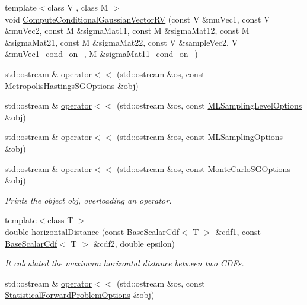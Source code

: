 \begin{DoxyCompactItemize}
\item 
{\footnotesize template$<$class V , class M $>$ }\\void \hyperlink{namespace_q_u_e_s_o_ad6d1e060295dcebaf3253c342c2a8746}{Compute\-Conditional\-Gaussian\-Vector\-R\-V} (const V \&mu\-Vec1, const V \&mu\-Vec2, const M \&sigma\-Mat11, const M \&sigma\-Mat12, const M \&sigma\-Mat21, const M \&sigma\-Mat22, const V \&sample\-Vec2, V \&mu\-Vec1\-\_\-cond\-\_\-on\-\_, M \&sigma\-Mat11\-\_\-cond\-\_\-on\-\_)
\item 
std\-::ostream \& \hyperlink{namespace_q_u_e_s_o_ab4def712856f22b50e34d21ef9093ac1}{operator$<$$<$} (std\-::ostream \&os, const \hyperlink{class_q_u_e_s_o_1_1_metropolis_hastings_s_g_options}{Metropolis\-Hastings\-S\-G\-Options} \&obj)
\item 
std\-::ostream \& \hyperlink{namespace_q_u_e_s_o_a81f910061e4d4ba4b3f823ffc3cc04dc}{operator$<$$<$} (std\-::ostream \&os, const \hyperlink{class_q_u_e_s_o_1_1_m_l_sampling_level_options}{M\-L\-Sampling\-Level\-Options} \&obj)
\item 
std\-::ostream \& \hyperlink{namespace_q_u_e_s_o_a5986e83af9a9a4845f9eeb03d94a8a94}{operator$<$$<$} (std\-::ostream \&os, const \hyperlink{class_q_u_e_s_o_1_1_m_l_sampling_options}{M\-L\-Sampling\-Options} \&obj)
\item 
std\-::ostream \& \hyperlink{namespace_q_u_e_s_o_a1e37d289bad8dc2aa2600ea78d1a6d9f}{operator$<$$<$} (std\-::ostream \&os, const \hyperlink{class_q_u_e_s_o_1_1_monte_carlo_s_g_options}{Monte\-Carlo\-S\-G\-Options} \&obj)
\begin{DoxyCompactList}\small\item\em Prints the object {\ttfamily obj}, overloading an operator. \end{DoxyCompactList}\item 
{\footnotesize template$<$class T $>$ }\\double \hyperlink{namespace_q_u_e_s_o_a389e9373827829b35f2bf36df32d0ef1}{horizontal\-Distance} (const \hyperlink{class_q_u_e_s_o_1_1_base_scalar_cdf}{Base\-Scalar\-Cdf}$<$ T $>$ \&cdf1, const \hyperlink{class_q_u_e_s_o_1_1_base_scalar_cdf}{Base\-Scalar\-Cdf}$<$ T $>$ \&cdf2, double epsilon)
\begin{DoxyCompactList}\small\item\em It calculated the maximum horizontal distance between two C\-D\-Fs. \end{DoxyCompactList}\item 
std\-::ostream \& \hyperlink{namespace_q_u_e_s_o_a185311186813492aebbb75fdf9943611}{operator$<$$<$} (std\-::ostream \&os, const \hyperlink{class_q_u_e_s_o_1_1_statistical_forward_problem_options}{Statistical\-Forward\-Problem\-Options} \&obj)

\end{DoxyCompactItemize}

